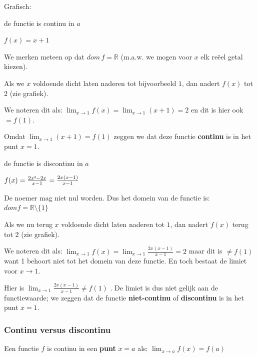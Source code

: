Grafisch:



\begin{voorbeeld}
de functie is continu in $a$ 

$f(x)=x+1$



We merken meteen op dat $dom\,f=\mathbb{R}$ (m.a.w. we mogen voor
$x$ elk re\"eel getal kiezen).

Als we $x$ voldoende dicht laten naderen tot bijvoorbeeld $1$, dan
nadert $f(x)$ tot $2$ (zie grafiek).

We noteren dit als: $\lim_{x\to1}f(x)=\lim_{x\to1}(x+1)=2$
en dit is hier ook $=f(1)$.

Omdat $\lim_{x\to1}(x+1)=f(1)$ zeggen we dat deze
functie \textbf{continu} is in het punt $x=1$.

\end{voorbeeld}


\begin{voorbeeld}
de functie is discontinu in $a$

$f(x)=\frac{2x\text{\texttwosuperior}-2x}{x-1}=\frac{2x(x-1)}{x-1}$

De noemer mag niet nul worden. Dus het domein van de functie is: $domf=\mathbb{R}\setminus\{1\}$


Als we nu terug $x$ voldoende dicht laten naderen tot $1$, dan nadert
$f(x)$ terug tot $2$ (zie grafiek).

We noteren dit als: $\lim_{x\to1}f(x)= \lim_{x\to1}\frac{2x(x-1)}{x-1}=2$
maar dit is $\neq f(1)$ want 1 behoort niet tot het domein van deze
functie. En toch bestaat de limiet voor $x\rightarrow1$.

Hier is $\lim_{x\to1}\frac{2x(x-1)}{x-1}\neq f(1)$
. De limiet is dus niet gelijk aan de functiewaarde; we zeggen dat
de functie \textbf{niet-continu} of \textbf{discontinu} is in het
punt $x=1$.

\end{voorbeeld}

\subsubsection{Continu versus discontinu}

Een functie $f$ is continu in een \textbf{punt} $x=a$ als: $\lim_{x\to a}f(x)=f(a)$

